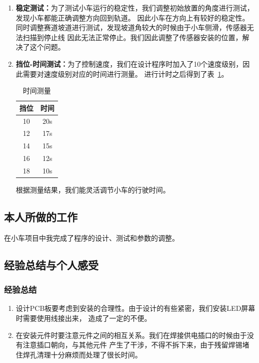 \documentclass[a4paper,twoside,zihao=5,UTF8]{ctexart}
\begin{document}
\begin{spacing}{1.2}
\begin{enumerate}
	\item \textbf{稳定测试：}为了测试小车运行的稳定性，我们调整初始放置的角度进行测试，发现小车都能正确调整方向回到轨道。
	因此小车在方向上有较好的稳定性。同时调整赛道坡道进行测试，发现坡道角较大的时候由于小车侧滑，传感器无法扫描到停止线
	因此无法正常停止。我们因此调整了传感器安装的位置，解决了这个问题。

	\item \textbf{挡位-时间测试：}为了控制速度，我们在设计程序时加入了10个速度级别，因此需要对速度级别对应的时间进行测量。
	进行计时之后得到了表~\ref{tbl:time}。
	\begin{table}[H]
		\centering
		\caption{时间测量}
		\label{tbl:time}
		\begin{tabular}{c|c}
			\toprule
			\hline
			挡位 & 时间 \\
			\hline
			10 & 20s \\
			12 & 17s \\
			14 & 15s \\
			16 & 12s \\
			18 & 10s \\
			\hline
			\bottomrule
		\end{tabular}
	\end{table}
	根据测量结果，我们能灵活调节小车的行驶时间。
\end{enumerate}

\subsection{本人所做的工作}

在小车项目中我完成了程序的设计、测试和参数的调整。

\subsection{经验总结与个人感受}

\subsubsection{经验总结}

\begin{enumerate}
	\item 设计PCB板要考虑到安装的合理性。由于设计的有些紧密，我们安装LED屏幕时需要使用线接出来，
	造成了一定的不便。

	\item 在安装元件时要注意元件之间的相互关系。我们在焊接供电插口的时候由于没有注意插口朝向，与其他元件
	产生了干涉，不得不拆下来，由于残留焊锡堵住焊孔清理十分麻烦而处理了很长时间。


\end{enumerate}
\end{spacing}
\end{document}
